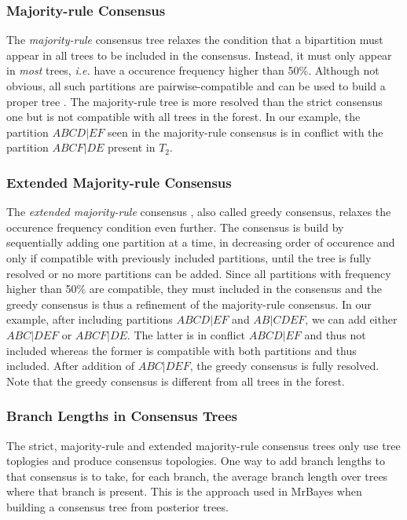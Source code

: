 \subsubsection{Majority-rule Consensus}

The \emph{majority-rule} consensus tree \citep{Margush1981} relaxes the condition that a bipartition must appear in all trees to be included in the consensus. Instead, it must only appear in \emph{most} trees, \emph{i.e.} have a occurence frequency higher than 50\%. Although not obvious, all such partitions are pairwise-compatible and can be used to build a proper tree \citep{Buneman1971}. The majority-rule tree is more resolved than the strict consensus one but is not compatible with all trees in the forest. In our example, the partition $ABCD|EF$ seen in the majority-rule consensus is in conflict with the partition $ABCF|DE$ present in $T_2$. 

\subsubsection{Extended Majority-rule Consensus}

The \emph{extended majority-rule} consensus \citep{Felsenstein2005}, also called greedy consensus, relaxes the occurence frequency condition even further. The consensus is build by sequentially adding one partition at a time, in decreasing order of occurence and only if compatible with previously included partitions, until the tree is fully resolved or no more partitions can be added. Since all partitions with frequency higher than 50\% are compatible, they must included in the consensus and the greedy consensus is thus a refinement of the majority-rule consensus. In our example, after including partitions $ABCD|EF$ and $AB|CDEF$, we can add either $ABC|DEF$ or $ABCF|DE$. The latter is in conflict $ABCD|EF$ and thus not included whereas the former is compatible with both partitions and thus included. After addition of $ABC|DEF$, the greedy consensus is fully resolved. Note that the greedy consensus is different from all trees in the forest. 

\subsubsection{Branch Lengths in Consensus Trees}

The strict, majority-rule and extended majority-rule consensus trees only use tree toplogies and produce consensus topologies. One way to add branch lengths to that consensus is to take, for each branch, the average branch length over trees where that branch is present. This is the approach used in MrBayes \citep{Ronquist2003} when building a consensus tree from posterior trees. 

